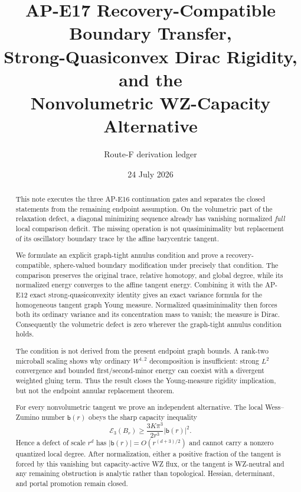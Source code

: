 \documentclass[10pt]{article}
\title{AP-E17 Recovery-Compatible Boundary Transfer,\\
Strong-Quasiconvex Dirac Rigidity, and the\\
Nonvolumetric WZ-Capacity Alternative}
\author{Route-F derivation ledger}
\date{24 July 2026}
\newcommand{\cE}{\mathcal E}
\begin{document}
\maketitle

\begin{abstract}
This note executes the three AP-E16 continuation gates and separates the
closed statements from the remaining endpoint assumption.  On the
volumetric part of the relaxation defect, a diagonal minimizing sequence
already has vanishing normalized \emph{full} local comparison deficit.  The
missing operation is not quasiminimality but replacement of its oscillatory
boundary trace by the affine barycentric tangent.

We formulate an explicit graph-tight annulus condition and prove a
recovery-compatible, sphere-valued boundary modification under precisely
that condition.  The comparison preserves the original trace, relative
homotopy, and global degree, while its normalized energy converges to the
affine tangent energy.  Combining it with the AP-E12 exact
strong-quasiconvexity identity gives an exact variance formula for the
homogeneous tangent graph Young measure.  Normalized quasiminimality then
forces both its ordinary variance and its concentration mass to vanish; the
measure is Dirac.  Consequently the volumetric defect is zero wherever the
graph-tight annulus condition holds.

The condition is not derived from the present endpoint graph bounds.  A
rank-two microball scaling shows why ordinary $W^{1,2}$ decomposition is
insufficient: strong $L^2$ convergence and bounded first/second-minor energy
can coexist with a divergent weighted gluing term.  Thus the result closes
the Young-measure rigidity implication, but not the endpoint annular
replacement theorem.

For every nonvolumetric tangent we prove an independent alternative.  The
local Wess--Zumino number $\mathsf b(r)$ obeys the sharp capacity inequality
\[
 \cE_3(B_r)\geq\frac{3K\pi^3}{2r^3}|\mathsf b(r)|^2 .
\]
Hence a defect of scale $r^d$ has
$|\mathsf b(r)|=O(r^{(d+3)/2})$ and cannot carry a nonzero quantized local
degree.  After normalization, either a positive fraction of the tangent is
forced by this vanishing but capacity-active WZ flux, or the tangent is
WZ-neutral and any remaining obstruction is analytic rather than
topological.  Hessian, determinant, and portal promotion remain closed.
\end{abstract}

\tableofcontents
\end{document}
